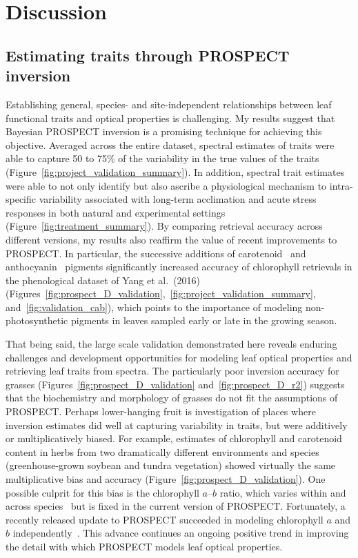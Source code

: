 \section{Discussion}

\subsection{Estimating traits through PROSPECT inversion}

Establishing general, species- and site-independent relationships between leaf functional traits and optical properties is challenging.
My results suggest that Bayesian PROSPECT inversion is a promising technique for achieving this objective.
Averaged across the entire dataset, spectral estimates of traits were able to capture 50 to 75\% of the variability in the true values of the traits (Figure~\ref{fig:project_validation_summary}).
In addition, spectral trait estimates were able to not only identify but also ascribe a physiological mechanism to intra-specific variability associated with long-term acclimation and acute stress responses in both natural and experimental settings (Figure~\ref{fig:treatment_summary}).
By comparing retrieval accuracy across different versions, my results also reaffirm the value of recent improvements to PROSPECT\@.
In particular, the successive additions of carotenoid~\cite{feret_2008_prospect} and anthocyanin~\cite{feret_2017_prospectd} pigments significantly increased accuracy of chlorophyll retrievals in the phenological dataset of Yang et al.~(2016) (Figures~\ref{fig:prospect_D_validation},~\ref{fig:project_validation_summary}, and~\ref{fig:validation_cab}), which points to the importance of modeling non-photosynthetic pigments in leaves sampled early or late in the growing season.

That being said, the large scale validation demonstrated here reveals enduring challenges and development opportunities for modeling leaf optical properties and retrieving leaf traits from spectra.
The particularly poor inversion accuracy for grasses (Figures~\ref{fig:prospect_D_validation} and~\ref{fig:prospect_D_r2}) suggests that the biochemistry and morphology of grasses do not fit the assumptions of PROSPECT\@.
Perhaps lower-hanging fruit is investigation of places where inversion estimates did well at capturing variability in traits, but were additively or multiplicatively biased.
For example, estimates of chlorophyll and carotenoid content in herbs from two dramatically different environments and species (greenhouse-grown soybean and tundra vegetation) showed virtually the same multiplicative bias and accuracy (Figure~\ref{fig:prospect_D_validation}).
One possible culprit for this bias is the chlorophyll $a$--$b$ ratio, which varies within and across species~\cite{kurahotta_1987_relationship,kitajima_2003_increases} but is fixed in the current version of PROSPECT\@.
Fortunately, a recently released update to PROSPECT succeeded in modeling chlorophyll $a$ and $b$ independently~\cite{zhang_2017_extended}.
This advance continues an ongoing positive trend in improving the detail with which PROSPECT models leaf optical properties.
 
